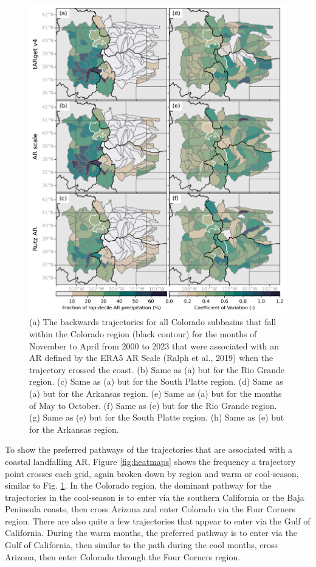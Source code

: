 \documentclass[draft]{agujournal2019}
\begin{document}
\begin{figure}
\noindent\includegraphics[width=\textwidth, height=\textheight, keepaspectratio]{fig3.png}
\caption{(a) The backwards trajectories for all Colorado subbasins that fall within the Colorado region (black contour) for the months of November to April from 2000 to 2023 that were associated with an AR defined by the ERA5 AR Scale (Ralph et al., 2019) when the trajectory crossed the coast. (b) Same as (a) but for the Rio Grande region. (c) Same as (a) but for the South Platte region. (d) Same as (a) but for the Arkansas region. (e) Same as (a) but for the months of May to October. (f) Same as (e) but for the Rio Grande region. (g) Same as (e) but for the South Platte region. (h) Same as (e) but for the Arkansas region.}
\label{fig:spaghetti_plot}
\end{figure}


To show the preferred pathways of the trajectories that are associated with a coastal landfalling AR, Figure \ref{fig:heatmaps} shows the frequency a trajectory point crosses each grid, again broken down by region and warm or cool-season, similar to Fig. \ref{fig:spaghetti_plot}. In the Colorado region, the dominant pathway for the trajectories in the cool-season is to enter via the southern California or the Baja Peninsula coasts, then cross Arizona and enter Colorado via the Four Corners region. There are also quite a few trajectories that appear to enter via the Gulf of California. During the warm months, the preferred pathway is to enter via the Gulf of California, then similar to the path during the cool months, cross Arizona, then enter Colorado through the Four Corners region. 
\end{document}
